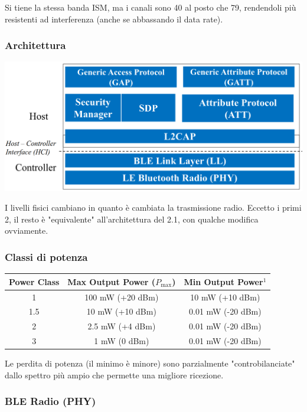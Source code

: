 Si tiene la stessa banda ISM, ma i canali sono 40 al posto che 79, rendendoli più resistenti ad interferenza (anche se abbassando il data rate). 

\subsubsection{Architettura}
\begin{center}
	\includegraphics[width=0.8\linewidth]{img/wpan/blearch}
\end{center}

I livelli fisici cambiano in quanto è cambiata la trasmissione radio. Eccetto i primi 2, il resto è "equivalente" all'architettura del 2.1, con qualche modifica ovviamente.

\subsubsection{Classi di potenza}
\begin{center}
	\begin{tabular}{|c|c|c|}
		\hline
		\textbf{Power Class} & \textbf{Max Output Power ($P_{\text{max}}$)} & \textbf{Min Output Power$^1$} \\
		\hline
		1   & 100 mW (+20 dBm)  & 10 mW (+10 dBm)  \\
		1.5 & 10 mW (+10 dBm)   & 0.01 mW (-20 dBm) \\
		2   & 2.5 mW (+4 dBm)   & 0.01 mW (-20 dBm) \\
		3   & 1 mW (0 dBm)      & 0.01 mW (-20 dBm) \\
		\hline
	\end{tabular}
\end{center}

Le perdita di potenza (il minimo è minore) sono parzialmente "controbilanciate" dallo spettro più ampio che permette una migliore ricezione.

\subsubsection{BLE Radio (PHY)}

